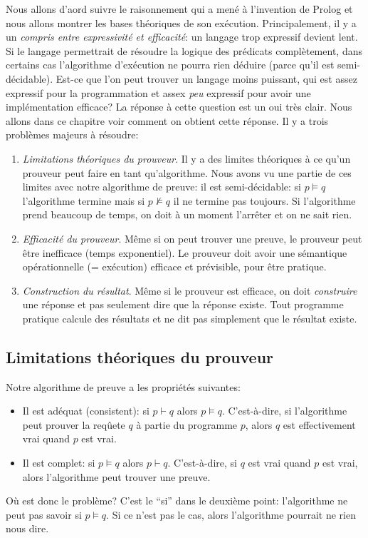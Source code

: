 Nous allons d'aord suivre le raisonnement qui a mené à l'invention de Prolog
et nous allons montrer les bases théoriques de son exécution.
Principalement, il y a un {\em compris entre expressivité et efficacité}:
un langage trop expressif devient lent.
Si le langage permettrait de résoudre la logique des prédicats complètement,
dans certains cas l'algorithme d'exécution ne pourra rien déduire (parce qu'il est semi-décidable).
Est-ce que l'on peut trouver un langage moins puissant, qui est assez expressif pour la programmation
et assex {\em peu} expressif pour avoir une implémentation efficace?
La réponse à cette question est un oui très clair.
Nous allons dans ce chapitre voir comment on obtient cette réponse.
Il y a trois problèmes majeurs à résoudre:
\begin{enumerate}
\item {\em Limitations théoriques du prouveur}.
Il y a des limites théoriques à ce qu'un prouveur peut faire en tant qu'algorithme.
Nous avons vu une partie de ces limites avec notre algorithme de preuve:
il est semi-décidable: si $p \models q$ l'algorithme termine mais si $p \not\models q$ il ne termine pas toujours.
Si l'algorithme prend beaucoup de temps, on doit à un moment l'arrêter et on ne sait rien.
\item {\em Efficacité du prouveur}.
Même si on peut trouver une preuve, le prouveur peut être inefficace (temps exponentiel).
Le prouveur doit avoir une sémantique opérationnelle (= exécution) efficace et prévisible, pour être pratique.
\item {\em Construction du résultat}.
Même si le prouveur est efficace, on doit {\em construire} une réponse et pas seulement dire que la réponse existe.
Tout programme pratique calcule des résultats et ne dit pas simplement que le résultat existe.
\end{enumerate}

\subsection{Limitations théoriques du prouveur}

Notre algorithme de preuve a les propriétés suivantes:
\begin{itemize}
\item Il est adéquat (consistent): si $p \vdash q$ alors $p \models q$.
C'est-à-dire, si l'algorithme peut prouver la reqûete $q$ à partie du programme $p$,
alors $q$ est effectivement vrai quand $p$ est vrai.
\item Il est complet: si $p \models q$ alors $p \vdash q$.
C'est-à-dire, si $q$ est vrai quand $p$ est vrai, alors l'algorithme peut trouver une preuve.
\end{itemize}
Où est donc le problème?
C'est le ``si'' dans le deuxième point: l'algorithme ne peut pas savoir si $p \models q$.
Si ce n'est pas le cas, alors l'algorithme pourrait ne rien nous dire.

